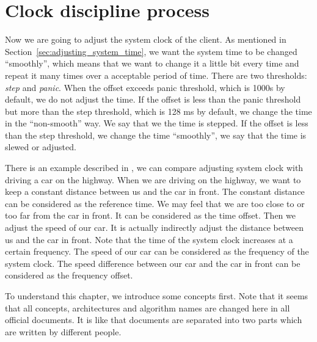 

\chapter{Clock discipline process}%
\label{cha:clock_discipline_process}
Now we are going to adjust the system clock of the client. As mentioned in 
Section~\ref{sec:adjusting_system_time}, we want the system time to be changed
``smoothly'', which means that we want to change it a little bit every time and 
repeat it many times over a acceptable period of time. There are two
thresholds: \emph{step} and \emph{panic}. When the offset exceeds panic
threshold, which is 1000s by default, we do not adjust the time. If the
offset is less than the panic threshold but more than the step threshold,
which is 128 ms by default, we change the time in the ``non-smooth'' way. We
say that we the time is stepped. If the offset is less than the step
threshold, we change the time ``smoothly'', we say that the time is slewed or
adjusted.

There is an example described in \cite{redbook}, we can compare adjusting
system clock with driving a car on the highway. When we are driving on the
highway, we want to keep a constant distance between us and the car in front.
The constant distance can be considered as the reference time. We may feel that
we are too close to or too far from the car in front. It can be considered as
the time offset. Then we adjust the speed of our car. It is actually indirectly
adjust the distance between us and the car in front. Note that the time of
the system clock increases at a certain frequency. The speed of our car can be
considered as the frequency of the system clock. The speed difference between
our car and the car in front can be considered as the frequency offset.

To understand this chapter, we introduce some concepts first. Note that it
seems that all concepts, architectures and algorithm names are changed here in
all official documents. It is like that documents are separated into two parts
which are written by different people.

